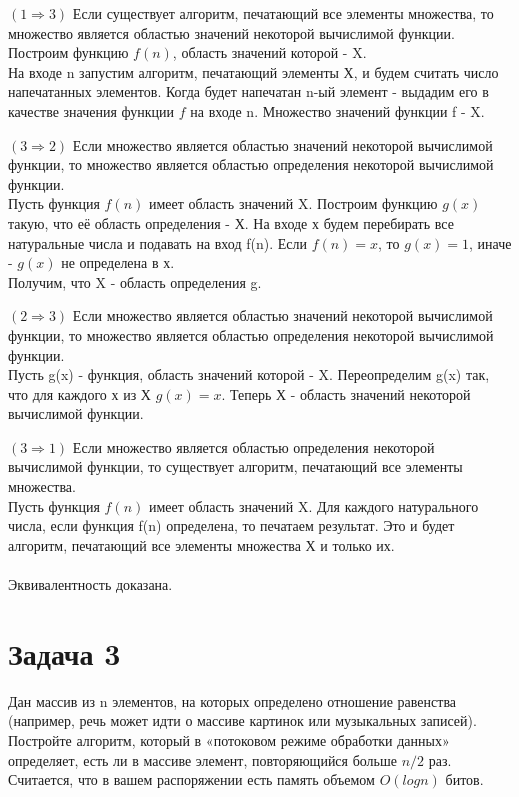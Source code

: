 \documentclass{article}
\begin{document}
$(1\Rightarrow3)$ Если существует алгоритм, печатающий все элементы множества, то множество является областью значений некоторой вычислимой функции.\\
Построим функцию $f(n)$, область значений которой - X.\\
На входе n запустим алгоритм, печатающий элементы Х, и будем считать число напечатанных элементов. Когда будет напечатан n-ый элемент - выдадим его в качестве значения функции $f$ на входе n. Множество значений функции f - X.

$(3 \Rightarrow 2)$ Если множество является областью значений некоторой вычислимой функции, то множество является областью определения некоторой вычислимой функции. \\
Пусть функция $f(n)$ имеет область значений X. Построим функцию $g(x)$ такую, что её область определения - Х. На входе х будем перебирать все натуральные числа и подавать на вход f(n). Если $f(n) = x$, то $g(x) = 1$, иначе - $g(x)$ не определена в х. \\Получим, что X - область определения g.

$(2 \Rightarrow 3)$ Если множество является областью значений некоторой вычислимой функции, то множество является областью определения некоторой вычислимой функции.\\
Пусть g(x) - функция, область значений которой - X. Переопределим g(x) так, что для каждого х из Х $g(x)=x$. Теперь Х - область значений некоторой вычислимой функции.

$(3 \Rightarrow 1)$ Если множество является областью определения некоторой вычислимой функции, то существует алгоритм, печатающий все элементы множества.\\
Пусть функция $f(n)$ имеет область значений X. Для каждого натурального числа, если функция f(n) определена, то печатаем результат. Это и будет алгоритм, печатающий все элементы множества Х и только их.
\\\\
Эквивалентность доказана.

\section*{Задача 3}

Дан массив из n элементов, на которых определено отношение равенства (например, речь может идти о массиве картинок или музыкальных записей). Постройте алгоритм, который в «потоковом режиме обработки данных» определяет, есть ли в массиве элемент, повторяющийся больше $n/2$ раз. Считается, что в вашем распоряжении есть память объемом $O(log n)$ битов.
\end{document}
